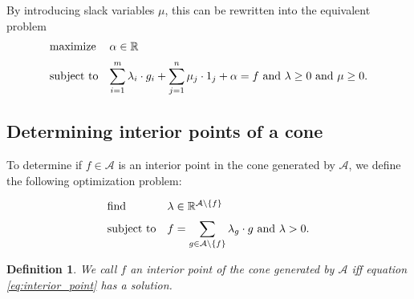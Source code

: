 \documentclass{article}
\theoremstyle{mytheorem}
\newtheorem{definition}[theorem]{Definition}
\newcommand{\set}[1]{\ensuremath{\{ #1 \} }} %
\begin{document}
\noindent
By introducing slack variables $\mu$, this can be rewritten into the equivalent problem
\begin{equation} \label{eq:lower_prevision_avoid_sure_loss_slack}
\begin{array}{ll}
    \text{maximize} & \alpha \in \mathbb{R} \\ [\medskipamount]
    \text{subject to} & 
    \displaystyle \sum\limits_{i = 1}^m \lambda_i \cdot g_i +
    \sum\limits_{j = 1}^n \mu_j \cdot 1_j + \alpha = f
    \text{ and } \lambda \geq 0 \text{ and } \mu \geq 0.
\end{array}
\end{equation}

\subsection{Determining interior points of a cone}
To determine if $f \in \mathcal{A}$ is an interior point in the cone generated by $\mathcal{A}$, we define the following optimization problem:

\begin{equation} \label{eq:interior_point}
\begin{array}{ll}
    \text{find} & \lambda \in \mathbb{R}^{\mathcal{A} \setminus \set{f}} \\ [\medskipamount]
    \text{subject to} & 
    \displaystyle f = \sum_{g \in \mathcal{A} \setminus \set{f}} \lambda_g \cdot g \text{ and } \lambda > 0.
\end{array}
\end{equation}


\begin{definition}
We call $f$ an \emph{interior point} of the cone generated by $\mathcal{A}$ iff equation \ref{eq:interior_point} has a solution.
\end{definition}
\end{document}
